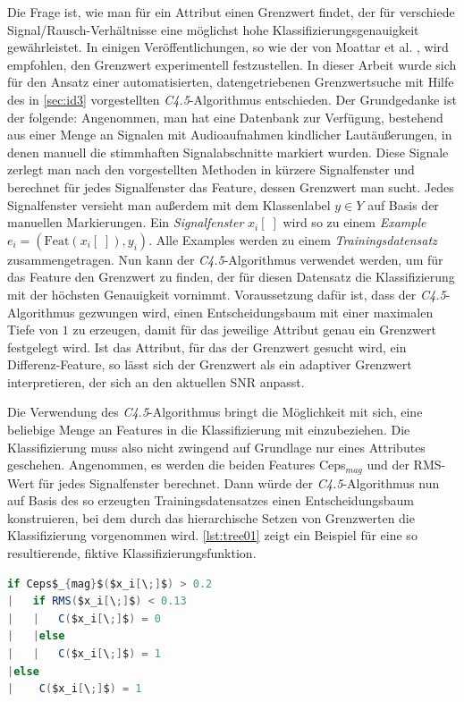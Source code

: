 Die Frage ist, wie man für ein Attribut einen Grenzwert findet, der für verschiede Signal/Rausch-Verhältnisse eine möglichst hohe Klassifizierungsgenauigkeit gewährleistet. In einigen Veröffentlichungen, so wie der von Moattar et al. \cite{vad_Easy}, wird empfohlen, den Grenzwert experimentell festzustellen. In dieser Arbeit wurde sich für den Ansatz einer automatisierten, datengetriebenen Grenzwertsuche mit Hilfe des in \autoref{sec:id3} vorgestellten \emph{C4.5}-Algorithmus entschieden. Der Grundgedanke ist der folgende: Angenommen, man hat eine Datenbank zur Verfügung, bestehend aus einer Menge an Signalen mit Audioaufnahmen kindlicher Lautäußerungen, in denen manuell die stimmhaften Signalabschnitte markiert wurden. Diese Signale zerlegt man nach den vorgestellten Methoden in kürzere Signalfenster und berechnet für jedes Signalfenster das Feature, dessen Grenzwert man sucht. Jedes Signalfenster versieht man außerdem mit dem Klassenlabel $y \in Y$ auf Basis der manuellen Markierungen. Ein \emph{Signalfenster} $x_i[\;]$ wird so zu einem \emph{Example} $e_i = (\text{Feat}(x_i[\;]), y_i)$. Alle Examples werden zu einem \emph{Trainingsdatensatz} zusammengetragen. Nun kann der \emph{C4.5}-Algorithmus verwendet werden, um für das Feature den Grenzwert zu finden, der für diesen Datensatz die Klassifizierung mit der höchsten Genauigkeit vornimmt. Voraussetzung dafür ist, dass der \emph{C4.5}-Algorithmus gezwungen wird, einen Entscheidungsbaum mit einer maximalen Tiefe von $1$ zu erzeugen, damit für das jeweilige Attribut genau ein Grenzwert festgelegt wird. Ist das Attribut, für das der Grenzwert gesucht wird, ein Differenz-Feature, so lässt sich der Grenzwert als ein adaptiver Grenzwert interpretieren, der sich an den aktuellen SNR anpasst.

Die Verwendung des \emph{C4.5}-Algorithmus bringt die Möglichkeit mit sich, eine beliebige Menge an Features in die Klassifizierung mit einzubeziehen. Die Klassifizierung muss also nicht zwingend auf Grundlage nur eines Attributes geschehen. Angenommen, es werden die beiden Features Ceps$_{mag}$ und der RMS-Wert für jedes Signalfenster berechnet. Dann würde der \emph{C4.5}-Algorithmus nun auf Basis des so erzeugten Trainingsdatensatzes einen Entscheidungsbaum konstruieren, bei dem durch das hierarchische Setzen von Grenzwerten die Klassifizierung vorgenommen wird. \autoref{lst:tree01} zeigt ein Beispiel für eine so resultierende, fiktive Klassifizierungsfunktion.

\begin{lstlisting}[frame=single,mathescape=true,basicstyle=\footnotesize,language=Java,label=lst:tree01,caption=Beispiel eines Entscheidungsbaums,linewidth=1\textwidth]
if Ceps$_{mag}$($x_i[\;]$) > 0.2
|   if RMS($x_i[\;]$) < 0.13
|   |   C($x_i[\;]$) = 0
|   |else
|   |   C($x_i[\;]$) = 1
|else
|    C($x_i[\;]$) = 1
\end{lstlisting}

